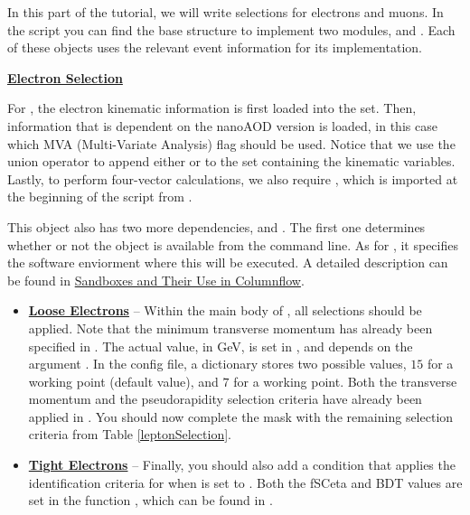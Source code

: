 In this part of the tutorial, we will write selections for electrons and muons.
In the script  you can find the base structure to implement two  modules,  and .
Each of these objects uses the relevant event information for its implementation.


\textbf{\underline{Electron Selection}}

For , the electron kinematic information is first loaded into the  set.
Then, information that is dependent on the nanoAOD version is loaded, in this case which MVA (Multi-Variate Analysis) flag should be used.
Notice that we use the union operator \code{|} to append either  or  to the set containing the kinematic variables.
Lastly, to perform four-vector calculations, we also require , which is imported at the beginning of the script from .


This  object also has two more dependencies,  and .
The first one determines whether or not the  object is available from the command line.
As for , it specifies the software enviorment where this  will be executed. A detailed description can be found in \href{https://columnflow.readthedocs.io/en/latest/user_guide/sandbox.html}{Sandboxes and Their Use in Columnflow}.

\newpage
\begin{itemize}
    \item {
        \textbf{\underline{Loose Electrons}} -- Within the main body of , all selections should be applied.
        Note that the minimum transverse momentum has already been specified in .
        The actual value, in GeV, is set in , and depends on the argument .
        In the config file, a dictionary stores two possible values, $15$ for a  working point (default value), and $7$ for a  working point.
        Both the transverse momentum and the pseudorapidity selection criteria have already been applied in .
        You should now complete the mask with the remaining selection criteria from Table \ref{leptonSelection}.
    }
    \item {
        \textbf{\underline{Tight Electrons}} -- Finally, you should also add a condition that applies the identification criteria for when  is set to .
        Both the fSCeta and BDT values are set in the function , which can be found in .
    }
\end{itemize}

